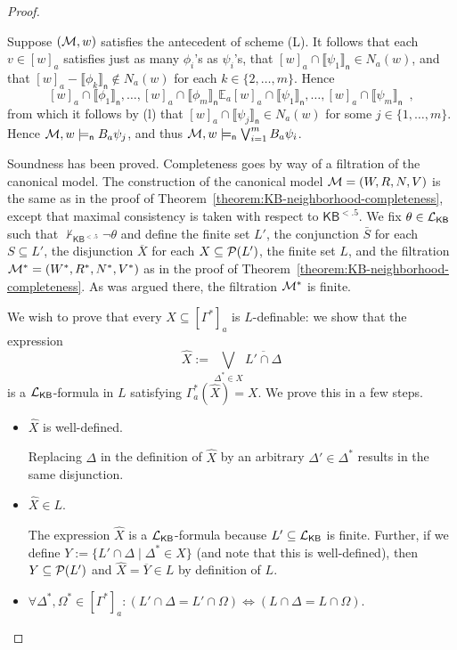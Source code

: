 \documentclass[12pt]{article}
\theoremstyle{definition}
\newcommand{\pow}{{\cal P}}    %
\newcommand{\M}{{\cal M}}      %
\newcommand{\Lang}{{\cal L}}   %
\newcommand{\KB}{{\mathsf{KB}}}                     %
\newcommand{\KBlt}{{\mathsf{KB}^{\mathsf{<.5}}}}    %
\newcommand{\modelsn}{\models_{\mathsf{n}}}                  %
\newcommand{\semn}[1]{\llbracket{#1}\rrbracket_{\mathsf{n}}} %
\begin{document}
\begin{proof}
\begin{itemize}
    Suppose $(\M,w)$ satisfies the antecedent of scheme (L).  It
    follows that each $v\in[w]_a$ satisfies just as many $\phi_i$'s as
    $\psi_i$'s, that $[w]_a\cap\semn{\psi_1}\in N_a(w)$, and that
    $[w]_a-\semn{\phi_k}\notin N_a(w)$ for each $k\in\{2,\dots,m\}$.
    Hence
    \[
    [w]_a\cap\semn{\phi_1},\dots,[w]_a\cap\semn{\phi_m}\mathbb{E}_a
    [w]_a\cap\semn{\psi_1},\dots, [w]_a\cap\semn{\psi_m}\enspace,
    \]
    from which it follows by (l) that $[w]_a\cap\semn{\psi_j}\in
    N_a(w)$ for some $j\in\{1,\dots,m\}$.  Hence $\M,w\modelsn B_a\psi_j$,
    and thus $\M,w\modelsn\bigvee_{i=1}^m B_a\psi_i$.
  \end{itemize}
  Soundness has been proved.  Completeness goes by way of a filtration
  of the canonical model.  The construction of the canonical model
  $\M=(W,R,N,V)$ is the same as in the proof of
  Theorem~\ref{theorem:KB-neighborhood-completeness}, except that
  maximal consistency is taken with respect to $\KBlt$.  We fix
  $\theta\in\Lang_\KB$ such that $\nvdash_\KBlt\lnot\theta$ and define
  the finite set $L'$, the conjunction $\bar S$ for each $S\subseteq
  L'$, the disjunction $\overline X$ for each $X\subseteq\pow(L')$,
  the finite set $L$, and the filtration $\M^*=(W^*,R^*,N^*,V^*)$ as
  in the proof of Theorem~\ref{theorem:KB-neighborhood-completeness}.
  As was argued there, the filtration $\M^*$ is finite.

  We wish to prove that every $X\subseteq[\Gamma^*]_a$ is
  $L$-definable: we show that the expression
  \[
  \hat X := \bigvee_{\Delta^*\in X}\overline{L'\cap\Delta}
  \]
  is a $\Lang_\KB$-formula in $L$ satisfying $\Gamma^*_a(\hat X)=X$.
  We prove this in a few steps.
  \begin{itemize}
  \item $\hat X$ is well-defined.

    Replacing $\Delta$ in the definition of $\hat X$ by an arbitrary
    $\Delta'\in\Delta^*$ results in the same disjunction.

  \item $\hat X\in L$.

    The expression $\hat X$ is a $\Lang_\KB$-formula because
    $L'\subseteq\Lang_\KB$ is finite. Further, if we define
    $Y:=\{L'\cap\Delta\mid \Delta^*\in X\}$ (and note that this is
    well-defined), then $Y\subseteq\pow(L')$ and $\hat X=\overline
    Y\in L$ by definition of $L$.

  \item $\forall\Delta^*,\Omega^*\in[\Gamma^*]_a:
    (L'\cap\Delta=L'\cap\Omega) \Leftrightarrow
    (L\cap\Delta=L\cap\Omega)$.


\end{itemize}
\end{proof}
\end{document}
